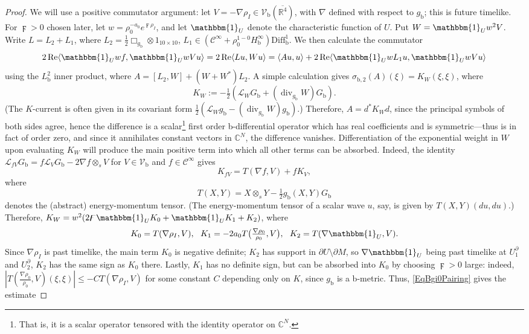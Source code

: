 \documentclass[reqno,11pt,letterpaper]{amsart}
\numberwithin{equation}{section}
\numberwithin{figure}{section}
\theoremstyle{definition}
\theoremstyle{remark}
\newcommand{\mc}{\mathcal}
\newcommand{\cC}{\mc C}
\newcommand{\cL}{\mc L}
\newcommand{\C}{\mathbb{C}}
\newcommand{\R}{\mathbb{R}}
\newcommand{\one}{\mathbbm{1}}
\renewcommand{\Re}{\operatorname{Re}}
\newcommand{\dv}{\operatorname{div}}
\newcommand{\la}{\langle}
\newcommand{\ol}{\overline}
\newcommand{\pa}{\partial}
\newcommand{\ra}{\rangle}
\newcommand{\bop}{{\mathrm{b}}}
\newcommand{\Diff}{\mathrm{Diff}}
\newcommand{\Vf}{\mathcal V}
\newcommand{\Vb}{\Vf_\bop}
\newcommand{\Diffb}{\Diff_\bop}
\newcommand{\half}{\tfrac{1}{2}}
\newcommand{\CI}{\cC^\infty}
\newcommand{\Hb}{H_{\bop}}
\begin{document}
\begin{proof}
  We will use a positive commutator argument: let $V=-\nabla\rho_I\in\Vb(\ol{\R^4})$, with $\nabla$ defined with respect to $g_\bop$; this is future timelike. For $\digamma>0$ chosen later, let $w=\rho_0^{-a_0}e^{\digamma\rho_I}$, and let $\one_U$ denote the characteristic function of $U$. Put $W=\one_U w^2 V$. Write $L=L_2+L_1$, where $L_2=\half\Box_{g_\bop}\otimes 1_{10\times 10}$, $L_1\in(\CI+\rho_0^{1-0}\Hb^\infty)\Diffb^1$. We then calculate the commutator
  \begin{equation}
  \label{EqBgi0Pairing}
    2 \Re \la \one_U w f, \one_U w V u\ra = 2 \Re \la L u, W u\ra = \la A u, u\ra + 2\Re \la \one_U wL_1 u, \one_U w V u \ra
  \end{equation}
  using the $L^2_\bop$ inner product, where $A=[L_2,W]+(W+W^*)L_2$. A simple calculation gives $\sigma_{\bop,2}(A)(\xi)=K_W(\xi,\xi)$, where
  \begin{equation}
  \label{EqBgi0KCurrent}
    K_W := -\half(\cL_W G_\bop + (\dv_{g_\bop}W)G_\bop).
  \end{equation}
  (The $K$-current is often given in its covariant form $\half(\cL_W g_\bop-(\dv_{g_\bop}W)g_\bop)$.) Therefore, $A=d^*K_W d$, since the principal symbols of both sides agree, hence the difference is a scalar\footnote{That is, it is a scalar operator tensored with the identity operator on $\C^N$.} first order b-differential operator which has real coefficients and is symmetric---thus is in fact of order zero, and since it annihilates constant vectors in $\C^N$, the difference vanishes. Differentiation of the exponential weight in $W$ upon evaluating $K_W$ will produce the main positive term into which all other terms can be absorbed. Indeed, the identity $\cL_{f V}G_\bop=f\cL_V G_\bop - 2\nabla f\otimes_s V$ for $V\in\Vb$ and $f\in\CI$ gives
  \begin{equation}
  \label{EqBgi0KCurrentRule}
    K_{f V} = T(\nabla f,V) + f K_V,
  \end{equation}
  where
  \[
    T(X,Y)=X\otimes_s Y-\half g_\bop(X,Y)G_\bop
  \]
  denotes the (abstract) energy-momentum tensor. (The energy-momentum tensor of a scalar wave $u$, say, is given by $T(X,Y)(d u,d u)$.) Therefore, $K_W=w^2(2\digamma\one_U K_0+\one_U K_1+K_2)$, where
  \[
    K_0 = T(\nabla\rho_I,V), \ \ 
    K_1 = -2 a_0 T\bigl(\tfrac{\nabla\rho_0}{\rho_0},V\bigr), \ \ 
    K_2 = T(\nabla\one_U,V).
  \]
  Since $\nabla\rho_I$ is past timelike, the main term $K_0$ is negative definite; $K_2$ has support in $\pa U\setminus\pa M$, so $\nabla\one_U$ being past timelike at $U^\pa_1$ and $U^\pa_2$, $K_2$ has the same sign as $K_0$ there. Lastly, $K_1$ has no definite sign, but can be absorbed into $K_0$ by choosing $\digamma>0$ large: indeed, $|T(\tfrac{\nabla\rho_0}{\rho_0},V)(\xi,\xi)| \leq -C T(\nabla\rho_I,V)$ for some constant $C$ depending only on $K$, since $g_\bop$ is a b-metric. Thus, \eqref{EqBgi0Pairing} gives the estimate

\end{proof}
\end{document}
